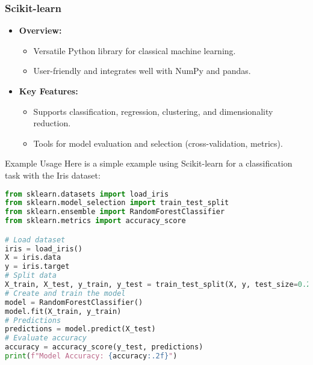 \documentclass[aspectratio=169]{beamer}
\begin{document}
\begin{frame}[fragile]
  \frametitle{Scikit-learn}
  \begin{itemize}
      \item \textbf{Overview:}
      \begin{itemize}
          \item Versatile Python library for classical machine learning.
          \item User-friendly and integrates well with NumPy and pandas.
      \end{itemize}
      
      \item \textbf{Key Features:}
      \begin{itemize}
          \item Supports classification, regression, clustering, and dimensionality reduction.
          \item Tools for model evaluation and selection (cross-validation, metrics).
      \end{itemize}
  \end{itemize}
  
  \begin{block}{Example Usage}
  Here is a simple example using Scikit-learn for a classification task with the Iris dataset:
  \end{block}
  
  \begin{lstlisting}[language=Python]
from sklearn.datasets import load_iris
from sklearn.model_selection import train_test_split
from sklearn.ensemble import RandomForestClassifier
from sklearn.metrics import accuracy_score

# Load dataset
iris = load_iris()
X = iris.data
y = iris.target
# Split data
X_train, X_test, y_train, y_test = train_test_split(X, y, test_size=0.2, random_state=42)
# Create and train the model
model = RandomForestClassifier()
model.fit(X_train, y_train)
# Predictions
predictions = model.predict(X_test)
# Evaluate accuracy
accuracy = accuracy_score(y_test, predictions)
print(f"Model Accuracy: {accuracy:.2f}")
  \end{lstlisting}

\end{frame}
\end{document}
